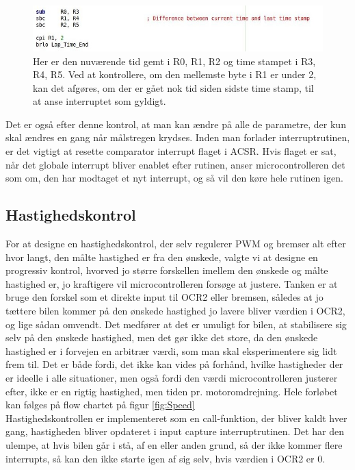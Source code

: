 \begin{figure}[h]

	\centering
		\includegraphics[scale=0.5]{Billeder/LapTime.jpg}
	\caption{Her er den nuværende tid gemt i R0, R1, R2 og time stampet i R3, R4, R5. Ved at kontrollere, om den mellemste byte i R1 er under 2, kan det afgøres, om der er gået nok tid siden sidste time stamp, til at anse interruptet som gyldigt.}
	\label{fig:LapTime}
	
\end{figure}

Det er også efter denne kontrol, at man kan ændre på alle de parametre, der kun skal ændres en gang når målstregen krydses. Inden man forlader interruptrutinen, er det vigtigt at resette comparator interrupt flaget i ACSR. Hvis flaget er sat, når det globale interrupt bliver enablet efter rutinen, anser microcontrolleren det som om, den har modtaget et nyt interrupt, og så vil den køre hele rutinen igen.

\subsection{Hastighedskontrol}
\label{sec:Hastighedskontrol}

For at designe en hastighedskontrol, der selv regulerer PWM og bremser alt efter hvor langt, den målte hastighed er fra den ønskede, valgte vi at designe en progressiv kontrol, hvorved jo større forskellen imellem den ønskede og målte hastighed er, jo kraftigere vil microcontrolleren forsøge at justere. Tanken er at bruge den forskel som et direkte input til OCR2 eller bremsen, således at jo tættere bilen kommer på den ønskede hastighed jo lavere bliver værdien i OCR2, og lige sådan omvendt. Det medfører at det er umuligt for bilen, at stabilisere sig selv på den ønskede hastighed, men det gør ikke det store, da den ønskede hastighed er i forvejen en arbitrær værdi, som man skal eksperimentere sig lidt frem til. Det er både fordi, det ikke kan vides på forhånd, hvilke hastigheder der er ideelle i alle situationer, men også fordi den værdi microcontrolleren justerer efter, ikke er en rigtig hastighed, men tiden pr. motoromdrejning. Hele forløbet kan følges på flow chartet på figur \ref{fig:Speed}\\
Hastighedskontrollen er implementeret som en call-funktion, der bliver kaldt hver gang, hastigheden bliver opdateret i input capture interruptrutinen. Det har den ulempe, at hvis bilen går i stå, af en eller anden grund, så der ikke kommer flere interrupts, så kan den ikke starte igen af sig selv, hvis værdien i OCR2 er 0. \\
